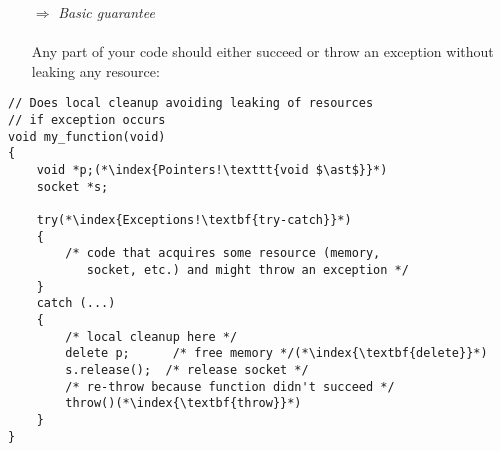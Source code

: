 \documentclass[10pt]{book}
\begin{document}
\begin{enumerate}
\item[$\Rightarrow$] \emph{Basic guarantee}\\ \\ Any part of your code should either succeed or throw an exception without leaking any resource:
\end{enumerate}
\begin{lstlisting}
// Does local cleanup avoiding leaking of resources
// if exception occurs
void my_function(void)
{
    void *p;(*\index{Pointers!\texttt{void $\ast$}}*) 
    socket *s;
    
    try(*\index{Exceptions!\textbf{try-catch}}*)
    {
        /* code that acquires some resource (memory, 
           socket, etc.) and might throw an exception */
    }
    catch (...)
    { 
        /* local cleanup here */
        delete p;      /* free memory */(*\index{\textbf{delete}}*)
        s.release();  /* release socket */  
        /* re-throw because function didn't succeed */
        throw()(*\index{\textbf{throw}}*)
    }    
}
\end{lstlisting}
%
%
\end{document}
